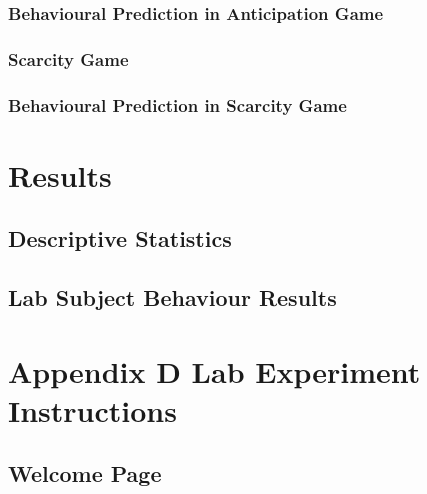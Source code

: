 \documentclass[11pt, a4paper, leqno]{article}
\begin{document}
            \subsubsection{Behavioural Prediction in Anticipation Game}\label{main:section33b}
                
            \subsubsection{Scarcity Game}\label{main:section34a}
                
            \subsubsection{Behavioural Prediction in Scarcity Game}\label{main:section34b}
                


\section{Results}\label{main:section4}
    \subsection{Descriptive Statistics}\label{main:section41}
    

    \subsection{Lab Subject Behaviour Results}\label{main:section42}
    



\printbibliography
{}

\appendix
    \section{Appendix D Lab Experiment Instructions}\label{app:A}
    \vspace{15pt}
    \subsection{Welcome Page}
    
\end{document}
